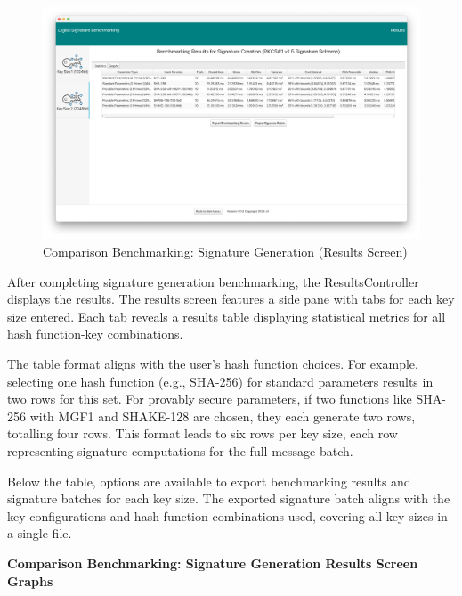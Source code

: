 \documentclass[]{final_report}
\theoremstyle{definition}
\begin{document}
\begin{figure}[H]
    \centering
    \includegraphics[scale= 0.325]{main_pictures/ui/signing/signing7-2.png}
    \caption{Comparison Benchmarking: Signature Generation (Results Screen)}
\end{figure}

After completing signature generation benchmarking, the ResultsController displays the results. The results screen features a side pane with tabs for each key size entered. Each tab reveals a results table displaying statistical metrics for all hash function-key combinations.

The table format aligns with the user's hash function choices. For example, selecting one hash function (e.g., SHA-256) for standard parameters results in two rows for this set. For provably secure parameters, if two functions like SHA-256 with MGF1 and SHAKE-128 are chosen, they each generate two rows, totalling four rows. This format leads to six rows per key size, each row representing signature computations for the full message batch.

Below the table, options are available to export benchmarking results and signature batches for each key size. The exported signature batch aligns with the key configurations and hash function combinations used, covering all key sizes in a single file.



\textbf{Comparison Benchmarking: Signature Generation Results Screen Graphs}
\end{document}
